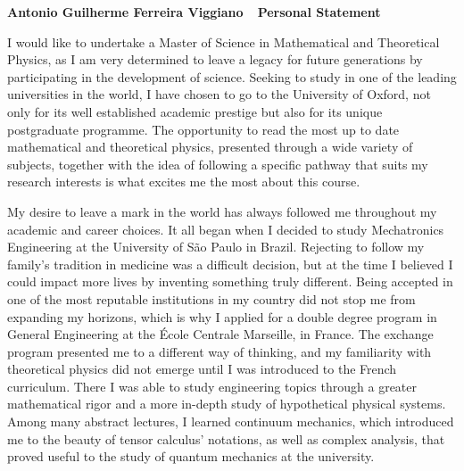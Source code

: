 \documentclass[10pt]{article}
\def\firstname{Antonio Guilherme }
\def\familyname{Ferreira Viggiano}
\def\FileTitle{\firstname\familyname~\textemdash~Personal Statement}
\newcommand*{\NEWLINE}{\vspace{0.75em}}
\begin{document}
\sffamily %

{\bfseries \FileTitle}
\NEWLINE{}\NEWLINE{}

I would like to undertake a Master of Science in Mathematical and Theoretical Physics, as I am very determined to leave a legacy for future generations by participating in the development of science. Seeking to study in one of the leading universities in the world, I have chosen to go to the University of Oxford, not only for its well established academic prestige but also for its unique postgraduate programme. The opportunity to read the most up to date mathematical and theoretical physics, presented through a wide variety of subjects, together with the idea of following a specific pathway that suits my research interests is what excites me the most about this course. \NEWLINE{}

My desire to leave a mark in the world has always followed me throughout my academic and career choices. It all began when I decided to study Mechatronics Engineering at the University of São Paulo in Brazil. Rejecting to follow my family's tradition in medicine was a difficult decision, but at the time I believed I could impact more lives by inventing something truly different. Being accepted in one of the most reputable institutions in my country did not stop me from expanding my horizons, which is why I applied for a double degree program in General Engineering at the École Centrale Marseille, in France. The exchange program presented me to a different way of thinking, and my familiarity with theoretical physics did not emerge until I was introduced to the French curriculum. There I was able to study engineering topics through a greater mathematical rigor and a more in-depth study of hypothetical physical systems. Among many abstract lectures, I learned continuum mechanics, which introduced me to the beauty of tensor calculus' notations, as well as complex analysis, that proved useful to the study of quantum mechanics at the university. \NEWLINE{}
\end{document}
